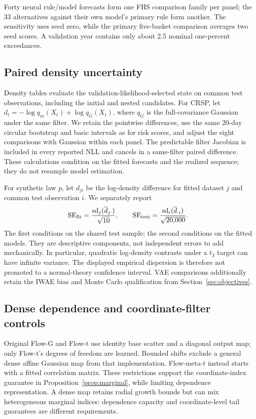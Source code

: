 \documentclass[11pt]{article}
\theoremstyle{definition}\newtheorem{definition}[theorem]{Definition}
\theoremstyle{remark}\newtheorem{remark}[theorem]{Remark}
\begin{document}
Forty neural rule/model forecasts form one FHS comparison family per panel; the 33 alternatives against their own model's primary rule form another. The sensitivity uses seed zero, while the primary five-basket comparison averages two seed scores. A validation year contains only about 2.5 nominal one-percent exceedances.

\subsection{Paired density uncertainty}\label{sec:density-uncertainty}
Density tables evaluate the validation-likelihood-selected state on common test observations, including the initial and nested candidates. For CRSP, let $d_t=-\log q_m(X_t)+\log q_G(X_t)$, where $q_G$ is the full-covariance Gaussian under the same filter. We retain the pointwise differences, use the same 20-day circular bootstrap and basic intervals as for risk scores, and adjust the eight comparisons with Gaussian within each panel. The predictable filter Jacobian is included in every reported NLL and cancels in a same-filter paired difference. These calculations condition on the fitted forecasts and the realized sequence; they do not resample model estimation.

For synthetic law $p$, let $d_{ji}$ be the log-density difference for fitted dataset $j$ and common test observation $i$. We separately report
\[
 \mathrm{SE}_{\rm fit}=\frac{\operatorname{sd}_j(\overline d_{j\cdot})}{\sqrt{10}},
 \qquad
 \mathrm{SE}_{\rm test}=\frac{\operatorname{sd}_i(\overline d_{\cdot i})}{\sqrt{20{,}000}}.
\]
The first conditions on the shared test sample; the second conditions on the fitted models. They are descriptive components, not independent errors to add mechanically. In particular, quadratic log-density contrasts under a $t_3$ target can have infinite variance. The displayed empirical dispersion is therefore not promoted to a normal-theory confidence interval. VAE comparisons additionally retain the IWAE bias and Monte Carlo qualification from Section~\ref{sec:objectives}.

\subsection{Dense dependence and coordinate-filter controls}\label{sec:lu-controls}
Original Flow-G and Flow-t use identity base scatter and a diagonal output map; only Flow-t's degrees of freedom are learned. Bounded shifts exclude a general dense affine Gaussian map from that implementation. Flow-meta-$t$ instead starts with a fitted correlation matrix. These restrictions support the coordinate-index guarantee in Proposition~\ref{prop:marginal}, while limiting dependence representation. A dense map retains radial growth bounds but can mix heterogeneous marginal indices: dependence capacity and coordinate-level tail guarantees are different requirements.
\end{document}

